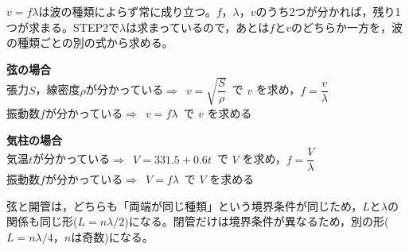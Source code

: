 \documentclass[a4paper,11pt]{ltjsarticle}
\begin{document}
$v=f\lambda$は波の種類によらず常に成り立つ。$f$，$\lambda$，$v$のうち2つが分かれば，残り1つが求まる。STEP2で$\lambda$は求まっているので，あとは$f$と$v$のどちらか一方を，波の種類ごとの別の式から求める。

\begin{formulabox}
\begin{center}
\textbf{弦の場合}\\[4pt]
張力$S$，線密度$\rho$が分かっている$\Rightarrow$ $\boxed{\,v=\sqrt{\dfrac{S}{\rho}}\,}$ で $v$ を求め，$f=\dfrac{v}{\lambda}$\\[6pt]
振動数$f$が分かっている$\Rightarrow$ $\boxed{\,v=f\lambda\,}$ で $v$ を求める
\end{center}
\end{formulabox}

\begin{formulabox}
\begin{center}
\textbf{気柱の場合}\\[4pt]
気温$t$が分かっている$\Rightarrow$ $\boxed{\,V=331.5+0.6t\,}$ で $V$ を求め，$f=\dfrac{V}{\lambda}$\\[6pt]
振動数$f$が分かっている$\Rightarrow$ $\boxed{\,V=f\lambda\,}$ で $V$ を求める
\end{center}
\end{formulabox}



\begin{pointbox}
弦と開管は，どちらも「両端が同じ種類」という境界条件が同じため，$L$と$\lambda$の関係も同じ形($L=n\lambda/2$)になる。閉管だけは境界条件が異なるため，別の形($L=n\lambda/4$，$n$は奇数)になる。
\end{pointbox}


\clearpage
\end{document}
